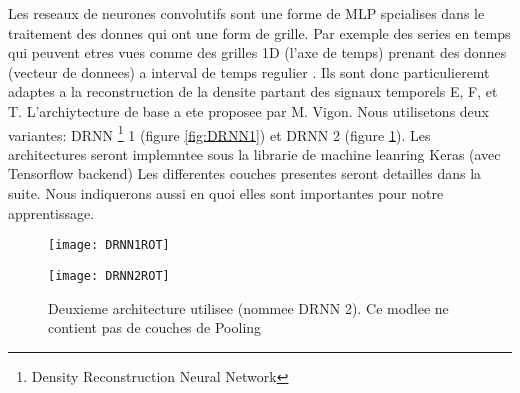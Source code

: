 Les reseaux de neurones convolutifs sont une forme de MLP spcialises dans le traitement des donnes qui ont une form de grille. Par exemple des series en temps qui peuvent etres vues comme des grilles 1D (l'axe de temps) prenant des donnes (vecteur de donnees) a interval de temps regulier \parencite{Reference5}. Ils sont donc particulieremt adaptes a la reconstruction de la densite partant des signaux temporels E, F, et T. L'archiytecture de base a ete proposee par M. Vigon. Nous utilisetons deux variantes: DRNN \footnote{Density Reconstruction Neural Network} 1 (figure \ref{fig:DRNN1}) et DRNN 2 (figure \ref{fig:DRNN2}).  Les architectures seront implemntee sous la librarie de machine leanring Keras (avec Tensorflow backend) Les differentes couches presentes seront detailles dans la suite. Nous indiquerons aussi en quoi elles sont importantes pour notre apprentissage.

% 

\newpage
\begin{figure}[!ht]
   \begin{minipage}{0.6\textwidth}
     \centering
     \texttt{[image: DRNN1ROT]}
     \decoRule
     \caption[DRNN1]{Premeire architecture (nommee DRNN 1 ). Le nombre de neurones utilises pour     
     chaque couches est indiques entre parentheses. Le nombre de neurnoes de la couche de sortie 
     depend qu'on soit en 1D ou en 2D.}
     \label{fig:DRNN1}
   \end{minipage}\hfill
   \begin{minipage}{0.4\textwidth}
     \centering
     \texttt{[image: DRNN2ROT]}
     \decoRule
     \caption[DRNN2]{Deuxieme architecture utilisee (nommee DRNN 2). Ce modlee ne contient pas de 
     couches de Pooling \footnotemark }
     \label{fig:DRNN2}
   \end{minipage}
\end{figure}

